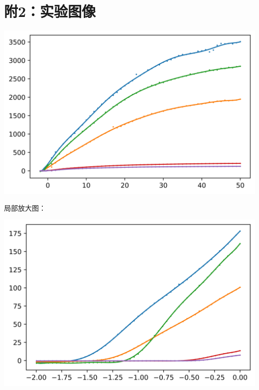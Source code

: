 \documentclass[a4paper]{ltxdoc}
\newenvironment{Figure}
  {\par\medskip\noindent\minipage{\linewidth}}
  {\endminipage\par\medskip}
\begin{document}
\section*{附2：实验图像}
\begin{Figure}
    \centering
    \includegraphics[width=\linewidth]{13.jpg}
\end{Figure}
\begin{Figure}
    \centering
    \large{局部放大图：}

    \includegraphics[width=\linewidth]{14.jpg}
\end{Figure}
\end{document}
